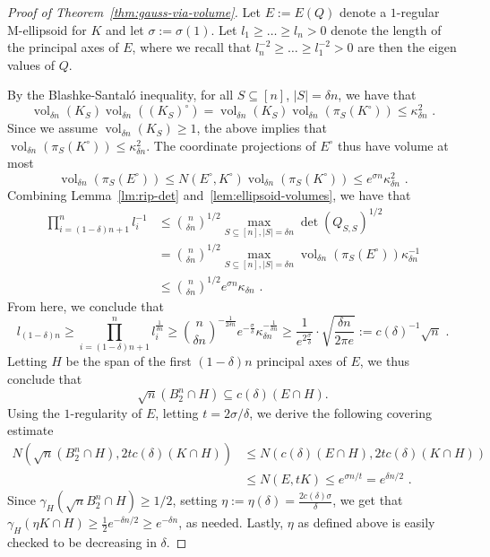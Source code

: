 \documentclass[12pt]{article}
\DeclareMathOperator{\vol}{vol}
\begin{document}
\begin{proof}[Proof of Theorem~\ref{thm:gauss-via-volume}]
Let $E := E(Q)$ denote a $1$-regular M-ellipsoid for $K$ and let $\sigma :=
\sigma(1)$. Let $l_1 \geq \dots \geq l_n > 0$ denote
the length of the principal axes of $E$, where we recall that
$l_n^{-2}\geq \dots \geq l_1^{-2} > 0$ are then the eigen values of $Q$.

By the Blashke-Santal{\'o} inequality, for all $S \subseteq
[n]$, $|S|=\delta n$, we have that 
\[
\vol_{\delta n}(K_S)\vol_{\delta n}((K_S)^\circ) = 
\vol_{\delta n}(K_S) \vol_{\delta n}(\pi_S(K^\circ)) \leq
\kappa_{\delta n}^2 \text{ .}
\]
Since we assume $\vol_{\delta n}(K_S) \geq 1$, the above implies that
$\vol_{\delta n}(\pi_S(K^\circ)) \leq \kappa_{\delta n}^2$. The
coordinate projections of $E^\circ$ thus have volume at most 
\[
\vol_{\delta n}(\pi_S(E^\circ)) \leq N(E^\circ,K^\circ)
\vol_{ \delta n}(\pi_S(K^\circ)) \leq e^{\sigma n} \kappa_{\delta n}^2 \text{ .}
\]
Combining Lemma~\ref{lm:rip-det} and~\ref{lem:ellipsoid-volumes}, we have that
\begin{align*}
\prod_{i=(1-\delta)n+1}^n l_i^{-1} &\leq \binom{n}{\delta n}^{1/2} \max_{S \subseteq
[n],|S|=\delta n} \det(Q_{S,S})^{1/2} \\
&= \binom{n}{\delta n}^{1/2} \max_{S \subseteq [n],|S|=\delta n}
\vol_{\delta n}(\pi_S(E^\circ)) \kappa_{\delta n}^{-1} \\
&\leq \binom{n}{\delta n}^{1/2} e^{\sigma n} \kappa_{\delta n} \text{ .}
\end{align*}
From here, we conclude that 
\[
l_{(1-\delta)n} \geq \prod_{i=(1-\delta)n+1}^n l_i^{\frac{1}{\delta
n}} \geq \binom{n}{\delta 
n}^{-\frac{1}{2\delta n}} e^{-\frac{\sigma}{\delta }} \kappa_{\delta
n}^{-\frac{1}{\delta n}} \geq 
\frac{1}{e^{2\frac{\sigma}{\delta }}} \cdot \sqrt{\frac{\delta n}{2\pi e}} :=
c(\delta)^{-1} \sqrt{n} \text{ .}
\] 
Letting $H$ be the span of the first $(1-\delta)n$ principal
axes of $E$, we thus conclude that 
\[
\sqrt{n} (B_2^n \cap H) \subseteq c(\delta) (E \cap H). 
\]
Using the $1$-regularity of $E$, letting $t = 2 \sigma / \delta$, we derive the
following covering estimate 
\begin{align*}
N(\sqrt{n} (B_2^n \cap H), 2 t c(\delta) (K \cap H))
&\leq N(c(\delta)(E \cap H), 2 t c(\delta) (K \cap H)) \\
&\leq N(E, t K) \leq e^{\sigma n / t} = e^{\delta n/2} \text{ .}
\end{align*}
Since $\gamma_H(\sqrt{n} B_2^n \cap H) \geq 1/2$, setting $\eta := \eta(\delta)
=\frac{2c(\delta)\sigma}{\delta}$, we get that $\gamma_H(\eta K \cap H) \geq
\frac{1}{2} e^{-\delta n/2} \geq e^{-\delta n}$, as needed. Lastly, $\eta$ as
defined above is easily checked to be decreasing in $\delta$.
\end{proof}
\end{document}
